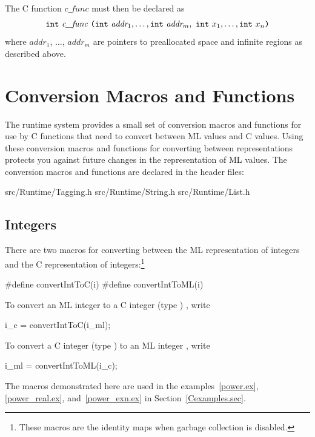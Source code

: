 \documentclass[12pt]{book}
\begin{document}
\noindent
The C function $\mathit{c\_func}$ must then be declared as
\begin{eqnarray}
  \texttt{int} \ \emph{c\_func} \ \texttt{(}\texttt{int}\ \emph{addr}_1,
    \ldots, \texttt{int}\ \emph{addr}_m,\ \texttt{int}\ x_1, \ldots, \texttt{int}\ x_n\texttt{)} \nonumber
\end{eqnarray}
\noindent
where $\mathit{addr}_1$, $\ldots$, $\mathit{addr}_m$ are pointers to
preallocated space and infinite regions as described above.


\section{Conversion Macros and Functions}
The runtime system provides a small set of conversion macros and functions for
use by C functions that need to convert between ML values and C values. Using
these conversion macros and functions for converting between representations
protects you against future changes in the representation of ML values. The
conversion macros and functions are declared in the header files:
%
%
%
%
\begin{scriptcode}
  src/Runtime/Tagging.h
  src/Runtime/String.h
  src/Runtime/List.h
\end{scriptcode}

\subsection{Integers}
There are two macros for converting between the ML representation of integers
and the C representation of integers:\footnote{These macros are the identity
maps when garbage collection is disabled.}
%
%
%
%
\begin{scriptcode}
  #define convertIntToC(i)
  #define convertIntToML(i)
\end{scriptcode}
To convert an ML integer  to a C integer (type )
, write
\begin{scriptcode}
  i_c = convertIntToC(i_ml);
\end{scriptcode}
To convert a C integer (type )  to an ML integer
, write
\begin{scriptcode}
  i_ml = convertIntToML(i_c);
\end{scriptcode}
The macros demonstrated here are used in the examples~\ref{power.ex},
\ref{power_real.ex}, and~\ref{power_exn.ex} in Section~\ref{Cexamples.sec}.
\end{document}

